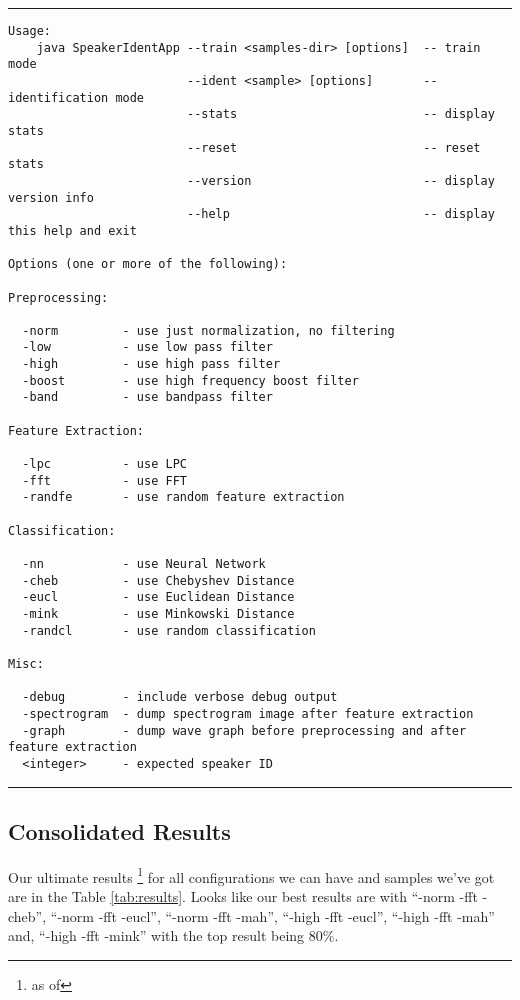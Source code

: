\vspace{15pt}
\hrule
{\small
\begin{verbatim}
Usage:
    java SpeakerIdentApp --train <samples-dir> [options]  -- train mode
                         --ident <sample> [options]       -- identification mode
                         --stats                          -- display stats
                         --reset                          -- reset stats
                         --version                        -- display version info
                         --help                           -- display this help and exit

Options (one or more of the following):

Preprocessing:

  -norm         - use just normalization, no filtering
  -low          - use low pass filter
  -high         - use high pass filter
  -boost        - use high frequency boost filter
  -band         - use bandpass filter

Feature Extraction:

  -lpc          - use LPC
  -fft          - use FFT
  -randfe       - use random feature extraction

Classification:

  -nn           - use Neural Network
  -cheb         - use Chebyshev Distance
  -eucl         - use Euclidean Distance
  -mink         - use Minkowski Distance
  -randcl       - use random classification

Misc:

  -debug        - include verbose debug output
  -spectrogram  - dump spectrogram image after feature extraction
  -graph        - dump wave graph before preprocessing and after feature extraction
  <integer>     - expected speaker ID
\end{verbatim}}
\hrule
\vspace{15pt}

\clearpage

\subsection{Consolidated Results}

Our ultimate results \footnote{as of } for all configurations we can have
and samples we've got are in the Table \ref{tab:results}.
Looks like our best results are with
``-norm -fft -cheb'',
``-norm -fft -eucl'',
``-norm -fft -mah'',
``-high -fft -eucl'',
``-high -fft -mah'' and,
``-high -fft -mink''
with the top result being 80\%.

